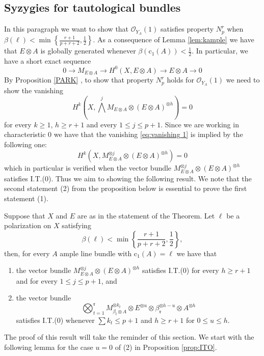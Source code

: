 \documentclass[11pt,letter]{amsart}
\numberwithin{equation}{section}
\begin{document}
\subsection{Syzygies for tautological bundles} In this paragraph we want to show that $\mathcal{O}_{Y_A}(1)$ satisfies property $N_p^r$ when $\beta(\ell)<\min\left\{\frac{r+1}{p+r+2},\frac{1}{2}\right\}$. As a consequence of Lemma \ref{lem:kample} we have that $E\otimes A$ is globally generated whenever $\beta(\mathrm{c}_1(A))<\frac{1}{2}$. In particular,  we have a short exact sequence
\begin{equation}\label{eq:sesEA}
    0\rightarrow M_{E\otimes A}\longrightarrow H^0(X, E\otimes A)\longrightarrow E\otimes A\rightarrow 0
\end{equation}
By Proposition \ref{PARK} , to show that property $N_p^r$ holds for $\mathcal{O}_{Y_A}(1)$ we need to show the vanishing
\begin{equation}\label{eq:vanishing 1}
    H^k\left(X,\bigwedge^jM_{E\otimes A}\otimes (E\otimes A)^{\otimes h}\right)=0
\end{equation}
for every $k\geq 1$, $h\geq r+1$ and every $1\leq j\leq p+1$.
Since we are working in characteristic 0 we have that the vanishing \eqref{eq:vanishing 1} is implied by the following one:
\begin{equation}\label{eq:vanishing 1}
    H^k(X,M_{E\otimes A}^{\otimes j}\otimes (E\otimes A)^{\otimes h})=0
\end{equation}
which in particular is verified when the vector bundle $M_{E\otimes A}^{\otimes j}\otimes (E\otimes A)^{\otimes h}$ satisfies I.T.(0). Thus we aim to showing the following result. We note that the second statement (2) from the proposition below is essential to prove the first statement (1). 
\begin{prop}\label{prop:ITO}
Suppose that $X$ and $E$ are as in the statement of the Theorem. Let $\ell$ be a polarization on $X$ satisfying 
\[
\beta(\ell)<\min\left\{\frac{r+1}{p+r+2},\frac{1}{2}\right\},
\]
then, for every $A$ ample line bundle with $\mathrm{c}_1(A)=\ell$ we have that 
\begin{enumerate}
\item the vector bundle $M_{E\otimes A}^{\otimes j}\otimes (E\otimes A)^{\otimes h}$ satisfies I.T.(0) for every $h\geq r+1$ and for every $1\leq j\leq p+1$, and
\item the vector bundle 
       \begin{equation}\label{eqn1rd}
    \bigotimes_{t=1}^{\mathfrak{r}}M_{\beta_t\otimes A}^{\otimes k_t}\otimes E^{\otimes u}\otimes \beta_{\mathfrak{r}}^{\otimes h-u}\otimes A^{\otimes h} \end{equation}
       satisfies I.T.(0) whenever $\sum k_t\leq p+1$ and $h\geq r+1$ for $0\leq u\leq h$.
\end{enumerate}
\end{prop}
The proof of this result will take the reminder of this section. We start with the following lemma for the case $u=0$ of (2) in Proposition \ref{prop:ITO}.
\end{document}
